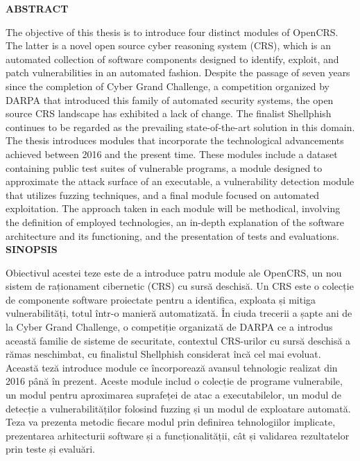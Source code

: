 \newcommand{\AbstractRO}{Obiectivul acestei teze este de a introduce patru module ale OpenCRS, un nou sistem de raționament cibernetic (CRS) cu sursă deschisă. Un CRS este o colecție de componente software proiectate pentru a identifica, exploata și mitiga vulnerabilități, totul într-o manieră automatizată. În ciuda trecerii a șapte ani de la Cyber Grand Challenge, o competiție organizată de DARPA ce a introdus această familie de sisteme de securitate, contextul CRS-urilor cu sursă deschisă a rămas neschimbat, cu finalistul Shellphish considerat încă cel mai evoluat. Această teză introduce module ce încorporează avansul tehnologic realizat din 2016 până în prezent. Aceste module includ o colecție de programe vulnerabile, un modul pentru aproximarea suprafeței de atac a executabilelor, un modul de detecție a vulnerabilităților folosind fuzzing și un modul de exploatare automată. Teza va prezenta metodic fiecare modul prin definirea tehnologiilor implicate, prezentarea arhitecturii software și a funcționalității, cât și validarea rezultatelor prin teste și evaluări.}

\newcommand{\AbstractEN}{
The objective of this thesis is to introduce four distinct modules of OpenCRS. The latter is a novel open source cyber reasoning system (CRS), which is an automated collection of software components designed to identify, exploit, and patch vulnerabilities in an automated fashion. Despite the passage of seven years since the completion of Cyber Grand Challenge, a competition organized by DARPA that introduced this family of automated security systems, the open source CRS landscape has exhibited a lack of change. The finalist Shellphish continues to be regarded as the prevailing state-of-the-art solution in this domain. The thesis introduces modules that incorporate the technological advancements achieved between 2016 and the present time. These modules include a dataset containing public test suites of vulnerable programs, a module designed to approximate the attack surface of an executable, a vulnerability detection module that utilizes fuzzing techniques, and a final module focused on automated exploitation. The approach taken in each module will be methodical, involving the definition of employed technologies, an in-depth explanation of the software architecture and its functioning, and the presentation of tests and evaluations.}

\thispagestyle{front}

\begin{titlepage}
    \textbf{\large ABSTRACT}\par
    \AbstractEN \vfill
    \textbf{\large SINOPSIS}\par
    \AbstractRO\par\vfill
\end{titlepage}